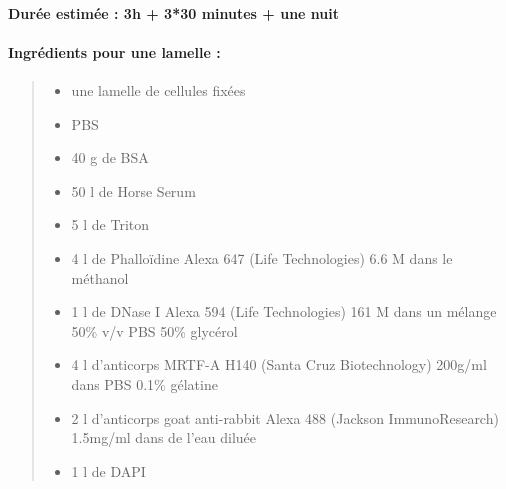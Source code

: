 \paragraph{Durée estimée : 3h + 3*30 minutes + une nuit }
 \paragraph{Ingrédients pour une lamelle : }
 \begin{quote}
 
 
 \begin{itemize}
 \item une lamelle de cellules fixées
 \item PBS
 \item 40 \micro g de BSA
 \item 50 \micro l de Horse Serum
 \item 5 \micro l de Triton
 \item 4 \micro l de Phalloïdine Alexa 647 (Life Technologies) 6.6 \micro M dans le méthanol
 \item 1 \micro l de DNase I Alexa 594 (Life Technologies) 161 \micro M dans un mélange 50\% v/v PBS 50\% glycérol
 \item 4 \micro l d'anticorps MRTF-A H140 (Santa Cruz Biotechnology) 200\micro g/ml dans PBS 0.1\% gélatine
 \item 2 \micro l d'anticorps goat anti-rabbit Alexa 488 (Jackson ImmunoResearch) 1.5mg/ml dans de l'eau diluée
 \item 1 \micro l de DAPI
 \end{itemize}
\end{quote}

